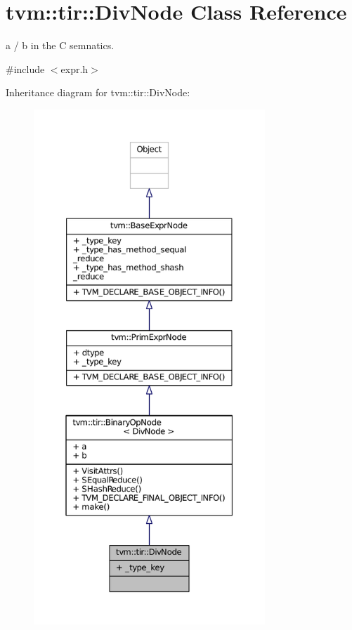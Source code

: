 \hypertarget{classtvm_1_1tir_1_1DivNode}{}\section{tvm\+:\+:tir\+:\+:Div\+Node Class Reference}
\label{classtvm_1_1tir_1_1DivNode}


a / b in the C semnatics.  




{\ttfamily \#include $<$expr.\+h$>$}



Inheritance diagram for tvm\+:\+:tir\+:\+:Div\+Node\+:
\nopagebreak
\begin{figure}[H]
\begin{center}
\leavevmode
\includegraphics[height=550pt]{classtvm_1_1tir_1_1DivNode__inherit__graph}
\end{center}
\end{figure}


